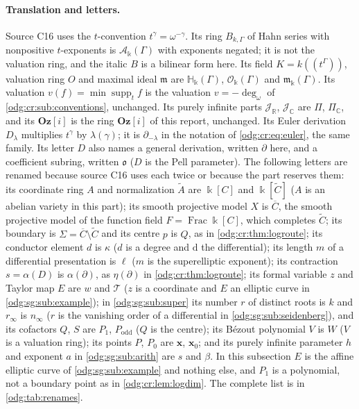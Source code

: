 \documentclass[11pt,oneside]{article}
\numberwithin{equation}{section}
\theoremstyle{definition}
\theoremstyle{remark}
\newcommand{\Oz}{\mathbf{Oz}}
\newcommand{\R}{\mathbb R}
\newcommand{\C}{\mathbb C}
\newcommand{\supp}{\operatorname{supp}}
\newcommand{\ddeg}{\operatorname{deg}_{\omega}}
\newcommand{\Frac}{\operatorname{Frac}}
\newcommand{\Og}{\Oz[i]}
\newcommand{\crH}{\mathbb H_\Bbbk(\Gamma)}
\newcommand{\crA}{\mathcal A_\Bbbk(\Gamma)}
\newcommand{\crO}{\mathcal O_\Bbbk(\Gamma)}
\newcommand{\crm}{\mathfrak m_\Bbbk(\Gamma)}
\newcommand{\dif}{\mathrm d}
\begin{document}
\paragraph{Translation and letters.} Source C16 uses the $t$-convention
$t^\gamma=\omega^{-\gamma}$. Its ring $B_{k,\Gamma}$ of Hahn series with nonpositive
$t$-exponents is $\crA$ with exponents negated; it is not the valuation ring, and the
italic $B$ is a bilinear form here. Its field $K=k((t^\Gamma))$, valuation ring $O$ and
maximal ideal $\mathfrak m$ are $\crH$, $\crO$ and $\crm$. Its valuation
$v(f)=\min\supp_t f$ is the valuation $v=-\ddeg$ of \cref{odg:cr:sub:conventions},
unchanged. Its purely infinite parts $\mathcal J_\R$, $\mathcal J_\C$ are $\Pi$, $\Pi_{\C}$,
and its $\Oz[i]$ is the ring $\Og$ of this report, unchanged. Its Euler derivation $D_\lambda$ multiplies $t^\gamma$ by
$\lambda(\gamma)$; it is $\partial_{-\lambda}$ in the notation of \eqref{odg:cr:eq:euler},
the same family. Its letter $D$ also names a general derivation, written $\partial$ here,
and a coefficient subring, written $\mathfrak o$ ($D$ is the Pell parameter). The
following letters are renamed because source C16 uses each twice or because the part
reserves them: its coordinate ring $A$ and normalization $\widetilde A$ are
$\Bbbk[C]$ and $\Bbbk[\widetilde C]$ ($A$ is an abelian variety in this part); its smooth
projective model $X$ is $\overline C$, the smooth projective model of the function field
$F=\Frac\Bbbk[C]$, which completes $\widetilde C$; its boundary is
$\Sigma=\overline C\setminus\widetilde C$ and its centre $p$ is $Q$, as in
\cref{odg:cr:thm:logroute}; its conductor element $d$ is $\kappa$ ($d$ is a degree and
$\dif$ the differential); its length $m$ of a differential presentation is $\ell$ ($m$ is
the superelliptic exponent); its contraction $s=\alpha(D)$ is $\alpha(\partial)$, as
$\eta(\partial)$ in \cref{odg:cr:thm:logroute}; its formal variable $z$ and Taylor map $E$
are $w$ and $\mathcal T$ ($z$ is a coordinate and $E$ an elliptic curve in
\cref{odg:sg:sub:example}); in \cref{odg:sg:sub:super} its number $r$ of distinct roots
is $k$ and $r_\infty$ is $n_\infty$ ($r$ is the vanishing order of a differential in
\cref{odg:sg:sub:seidenberg}), and its cofactors $Q$, $S$ are $P_1$, $P_{\mathrm{odd}}$
($Q$ is the centre); its B\'ezout polynomial $V$ is $W$ ($V$ is a valuation ring); its
points $P$, $P_0$ are $\mathbf x$, $\mathbf x_0$; and its purely infinite parameter $h$ and
exponent $a$ in \cref{odg:sg:sub:arith} are $s$ and $\beta$. In this subsection $E$ is the
affine elliptic curve of \cref{odg:sg:sub:example} and nothing else, and $P_1$ is a
polynomial, not a boundary point as in \cref{odg:cr:lem:logdim}. The complete list is in
\cref{odg:tab:renames}.
\end{document}
